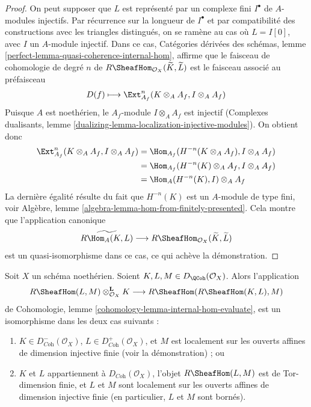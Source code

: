 \begin{proof}
On peut supposer que $L$ est représenté par un complexe fini $I^\bullet$ de $A$-modules injectifs. Par récurrence sur la longueur de $I^\bullet$ et par compatibilité des constructions avec les triangles distingués, on se ramène au cas où $L = I[0]$, avec $I$ un $A$-module injectif. Dans ce cas, Catégories dérivées des schémas, lemme \ref{perfect-lemma-quasi-coherence-internal-hom}, affirme que le faisceau de cohomologie de degré $n$ de $R\SheafHom_{\mathcal{O}_X}(\widetilde{K}, \widetilde{L})$ est le faisceau associé au préfaisceau
$$
D(f) \longmapsto \Ext^n_{A_f}(K \otimes_A A_f, I \otimes_A A_f)
$$
Puisque $A$ est noethérien, le $A_f$-module $I \otimes_A A_f$ est injectif (Complexes dualisants, lemme \ref{dualizing-lemma-localization-injective-modules}). On obtient donc
\begin{align*}
\Ext^n_{A_f}(K \otimes_A A_f, I \otimes_A A_f)
& =
\Hom_{A_f}(H^{-n}(K \otimes_A A_f), I \otimes_A A_f) \\
& =
\Hom_{A_f}(H^{-n}(K) \otimes_A A_f, I \otimes_A A_f) \\
& =
\Hom_A(H^{-n}(K), I) \otimes_A A_f
\end{align*}
La dernière égalité résulte du fait que $H^{-n}(K)$ est un $A$-module de type fini, voir Algèbre, lemme \ref{algebra-lemma-hom-from-finitely-presented}. Cela montre que l'application canonique
$$
\widetilde{R\Hom_A(K, L)}
\longrightarrow
R\SheafHom_{\mathcal{O}_X}(\widetilde{K}, \widetilde{L})
$$
est un quasi-isomorphisme dans ce cas, ce qui achève la démonstration.
\end{proof}

\begin{lemma}
\label{lemma-internal-hom-evaluate-isom}
Soit $X$ un schéma noethérien. Soient $K, L, M \in D_\QCoh(\mathcal{O}_X)$. Alors l'application
$$
R\SheafHom(L, M) \otimes_{\mathcal{O}_X}^\mathbf{L} K
\longrightarrow
R\SheafHom(R\SheafHom(K, L), M)
$$
de Cohomologie, lemme \ref{cohomology-lemma-internal-hom-evaluate}, est un isomorphisme dans les deux cas suivants :
\begin{enumerate}
\item $K \in D^-_{\textit{Coh}}(\mathcal{O}_X)$, $L \in D^+_{\textit{Coh}}(\mathcal{O}_X)$, et $M$ est localement sur les ouverts affines de dimension injective finie (voir la démonstration) ; ou
\item \begingroup\emergencystretch=12pt $K$ et $L$ appartiennent à $D_{\textit{Coh}}(\mathcal{O}_X)$, l'objet $R\SheafHom(L, M)$ est de Tor-dimension finie, et $L$ et $M$ sont localement sur les ouverts affines de dimension injective finie (en particulier, $L$ et $M$ sont bornés).\par\endgroup
\end{enumerate}
\end{lemma}

